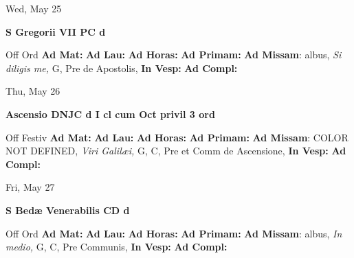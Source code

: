 \documentclass[10pt]{book}
\begin{document}
\begin{center}
\begin{minipage}{3.5in}
\vspace{2em}
\begin{center}Wed, May 25
\end{center}
\textbf{ \large S Gregorii VII PC
\textnormal{\normalsize d}}

\begin{justify}Off Ord
\textbf{Ad Mat: }
\textbf{Ad Lau: }
\textbf{Ad Horas: }
\textbf{Ad Primam: }\textbf{Ad Missam}: albus, \textit{Si diligis me,} G, Pre de Apostolis, 
\textbf{In Vesp: }
\textbf{Ad Compl: }
\end{justify}
\end{minipage}
\end{center}

\begin{center}
\begin{minipage}{3.5in}
\vspace{2em}
\begin{center}Thu, May 26
\end{center}
\textbf{ \large Ascensio DNJC
\textnormal{\normalsize d I cl cum Oct privil 3 ord}}

\begin{justify}Off Festiv
\textbf{Ad Mat: }
\textbf{Ad Lau: }
\textbf{Ad Horas: }
\textbf{Ad Primam: }\textbf{Ad Missam}: COLOR NOT DEFINED, \textit{Viri Galilæi,} G, C, Pre et Comm de Ascensione, 
\textbf{In Vesp: }
\textbf{Ad Compl: }
\end{justify}
\end{minipage}
\end{center}

\begin{center}
\begin{minipage}{3.5in}
\vspace{2em}
\begin{center}Fri, May 27
\end{center}
\textbf{ \large S Bedæ Venerabilis CD
\textnormal{\normalsize d}}

\begin{justify}Off Ord
\textbf{Ad Mat: }
\textbf{Ad Lau: }
\textbf{Ad Horas: }
\textbf{Ad Primam: }\textbf{Ad Missam}: albus, \textit{In medio,} G, C, Pre Communis, 
\textbf{In Vesp: }
\textbf{Ad Compl: }
\end{justify}
\end{minipage}
\end{center}
\end{document}
